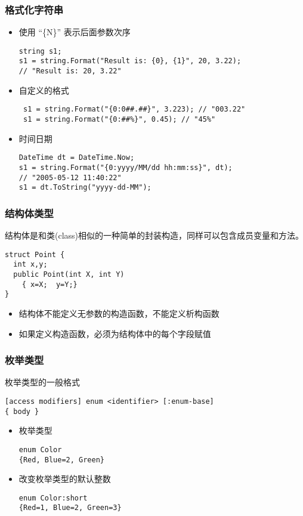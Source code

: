 \begin{frame}[fragile]
\frametitle{格式化字符串}
\CJKindent
\begin{itemize}
\item 使用 ``\{N\}'' 表示后面参数次序
\begin{lstlisting}
string s1;
s1 = string.Format("Result is: {0}, {1}", 20, 3.22);
// "Result is: 20, 3.22"

\end{lstlisting}
\pause
\item 自定义的格式
\begin{lstlisting}
 s1 = string.Format("{0:0##.##}", 3.223); // "003.22"
 s1 = string.Format("{0:##%}", 0.45); // "45%"
\end{lstlisting}
\pause
\item 时间日期
\begin{lstlisting}
DateTime dt = DateTime.Now;
s1 = string.Format("{0:yyyy/MM/dd hh:mm:ss}", dt);
// "2005-05-12 11:40:22"
s1 = dt.ToString("yyyy-dd-MM");
\end{lstlisting}
\end{itemize}
\end{frame}

\begin{frame}[fragile]
\frametitle{结构体类型}
\CJKindent 结构体是和类(class)相似的一种简单的封装构造，同样可以包含成员变量和方法。
\begin{lstlisting}[escapeinside=<>]
struct Point {
  int x,y;
  public Point(int X, int Y)
    { x=X;  y=Y;}
}
\end{lstlisting}
\begin{itemize}
\item 结构体不能定义无参数的构造函数，不能定义析构函数
\item 如果定义构造函数，必须为结构体中的每个字段赋值
\end{itemize}
\end{frame}


\begin{frame}[fragile]
\frametitle{枚举类型}
枚举类型的一般格式
\begin{lstlisting}
[access modifiers] enum <identifier> [:enum-base]
{ body }
\end{lstlisting}

\begin{itemize}
    \setlength{\itemsep}{8pt plus 1pt}
\item 枚举类型
\begin{lstlisting}
enum Color
{Red, Blue=2, Green}

\end{lstlisting}

\item 改变枚举类型的默认整数
\begin{lstlisting}
enum Color:short
{Red=1, Blue=2, Green=3}
\end{lstlisting}
\end{itemize}
\end{frame}

